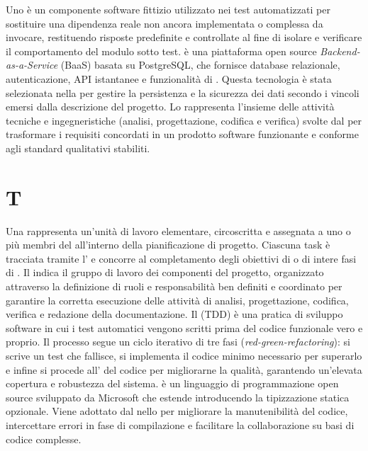 Uno  è un componente software fittizio utilizzato nei test automatizzati per sostituire una dipendenza reale non ancora implementata o complessa da invocare, restituendo risposte predefinite e controllate al fine di isolare e verificare il comportamento del modulo sotto test.
 è una piattaforma open source \emph{Backend-as-a-Service} (BaaS) basata su PostgreSQL, che fornisce database relazionale, autenticazione, API istantanee e funzionalità di . Questa tecnologia è stata selezionata nella  per gestire la persistenza e la sicurezza dei dati secondo i vincoli emersi dalla descrizione del progetto.
Lo  rappresenta l'insieme delle attività tecniche e ingegneristiche (analisi, progettazione, codifica e verifica) svolte dal  per trasformare i requisiti concordati in un prodotto software funzionante e conforme agli standard qualitativi stabiliti.
\section{T}
Una  rappresenta un'unità di lavoro elementare, circoscritta e assegnata a uno o più membri del  all'interno della pianificazione di progetto. Ciascuna task è tracciata tramite l' e concorre al completamento degli obiettivi di  o di intere fasi di .
Il  indica il gruppo di lavoro dei componenti del progetto, organizzato attraverso la definizione di ruoli e responsabilità ben definiti e coordinato per garantire la corretta esecuzione delle attività di analisi, progettazione, codifica, verifica e redazione della documentazione.
Il  (TDD) è una pratica di sviluppo software in cui i test automatici vengono scritti prima del codice funzionale vero e proprio. Il processo segue un ciclo iterativo di tre fasi (\emph{red-green-refactoring}): si scrive un test che fallisce, si implementa il codice minimo necessario per superarlo e infine si procede all' del codice per migliorarne la qualità, garantendo un'elevata copertura e robustezza del sistema.
 è un linguaggio di programmazione open source sviluppato da Microsoft che estende  introducendo la tipizzazione statica opzionale. Viene adottato dal  nello  per migliorare la manutenibilità del codice, intercettare errori in fase di compilazione e facilitare la collaborazione su basi di codice complesse.
